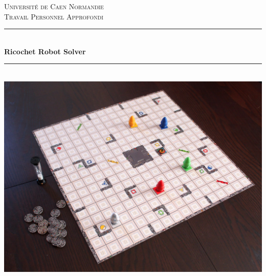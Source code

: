 \documentclass[12pt, a4paper, openany]{article}
\newcommand{\HRule}{\rule{\linewidth}{0.5mm}}
\begin{document}
\begin{titlepage}
 \begin{center}

   
    \textsc{\LARGE \color{RedViolet} Université de Caen Normandie}\\[2cm]
    \textsc {\Large Travail Personnel Approfondi}\\[1.5cm]
    
    \HRule \\[0.4cm]
    
    { \huge \bfseries \color  {RedViolet}Ricochet Robot Solver\\[0.4cm] }
    
    \HRule \\[2cm]
    
    \includegraphics[scale=0.2]{imageRobot.jpg}
    \\[2cm]
    
 


\end{center}
\end{titlepage}
\end{document}
